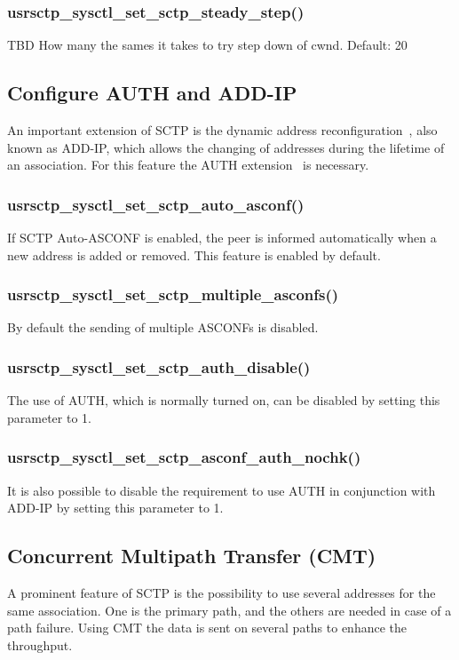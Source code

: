 \documentclass[a4paper]{article}
\begin{document}
\subsubsection{usrsctp\_sysctl\_set\_sctp\_steady\_step()}
TBD
How many the sames it takes to try step down of cwnd. Default: 20


\subsection{Configure AUTH and ADD-IP}
An important extension of SCTP is the dynamic address reconfiguration~\cite{addip}, also known as
ADD-IP, which allows the changing of addresses during the lifetime of an association.
For this feature the AUTH extension~\cite{auth} is necessary.

\subsubsection{usrsctp\_sysctl\_set\_sctp\_auto\_asconf()}
If SCTP Auto-ASCONF is enabled, the peer is informed automatically when a new address
is added or removed. This feature is enabled by default.

\subsubsection{usrsctp\_sysctl\_set\_sctp\_multiple\_asconfs()}
By default the sending of multiple ASCONFs is disabled.

\subsubsection{usrsctp\_sysctl\_set\_sctp\_auth\_disable()}
The use of AUTH, which is normally turned on, can be disabled by setting this parameter to 1.

\subsubsection{usrsctp\_sysctl\_set\_sctp\_asconf\_auth\_nochk()}
It is also possible to disable the requirement to use AUTH in conjunction with ADD-IP by setting this parameter
to 1.


\subsection{Concurrent Multipath Transfer (CMT)}
A prominent feature of SCTP is the possibility to use several addresses for the same association.
One is the primary path, and the others are needed in case of a path failure. Using CMT the data is sent 
on several paths to enhance the throughput.
\end{document}
